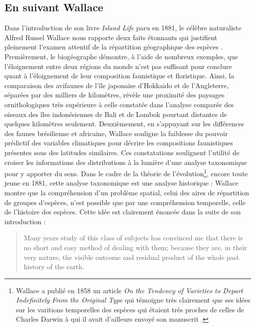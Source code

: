 \subsection*{En suivant Wallace}\label{en-suivant-wallace}

Dans l'introduction de son livre \emph{Island Life} paru en 1881, le
célèbre naturaliste Alfred Russel Wallace nous rapporte deux faits
étonnants qui justifient pleinement l'examen attentif de la répartition
géographique des espèces \citep{wallace1881island}. Premièrement, le
biogéographe démontre, à l'aide de nombreux exemples, que l'éloignement
entre deux régions du monde n'est pas suffisant pour conclure quant à
l'éloignement de leur composition faunistique et floristique. Ainsi, la
comparaison des avifaunes de l'île japonaise d'Hokkaido et de
l'Angleterre, séparées par des milliers de kilomètres, révèle une
proximité des paysages ornithologiques très supérieure à celle constatée
dans l'analyse comparée des oiseaux des îles indonésiennes de Bali et de
Lombok pourtant distantes de quelques kilomètres seulement.
Deuxièmement, en s'appuyant sur les différences des faunes brésilienne
et africaine, Wallace souligne la faiblesse du pouvoir prédictif des
variables climatiques pour décrire les compositions faunistiques
présentes sous des latitudes similaires. Ces constatations soulignent
l'utilité de croiser les informations des distributions à la lumière
d'une analyse taxonomique pour y apporter du sens. Dans le cadre de la
théorie de l'évolution\footnote{Wallace a publié en 1858 un article
  \emph{On the Tendency of Varieties to Depart Indefinitely From the
  Original Type} qui témoigne très clairement que ses idées sur les
  varitions temporelles des espèces qui étaient très proches de celles
  de Charles Darwin à qui il avait d'ailleurs envoyé son manuscrit
  \citep{Wallace1858}.}, encore toute jeune en 1881, cette analyse
taxonomique est une analyse historique : Wallace montre que la
compréhension d'un problème spatial, celui des aires de répartition de
groupes d'espèces, n'est possible que par une compréhension temporelle,
celle de l'histoire des espèces. Cette idée est clairement énoncée dans
la suite de son introduction :

\begin{quote}
Many years study of this class of subjects has convinced me that there
is no short and easy method of dealing with them; because they are, in
their very nature, the visible outcome and residual product of the whole
past history of the earth.
\end{quote}

